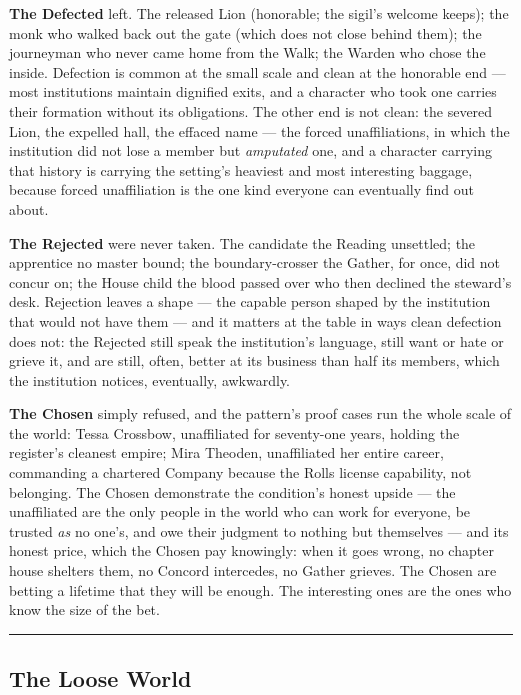 \textbf{The Defected} left. The released Lion (honorable; the sigil's welcome keeps); the monk who walked back out the gate (which does not close behind them); the journeyman who never came home from the Walk; the Warden who chose the inside. Defection is common at the small scale and clean at the honorable end --- most institutions maintain dignified exits, and a character who took one carries their formation without its obligations. The other end is not clean: the severed Lion, the expelled hall, the effaced name --- the forced unaffiliations, in which the institution did not lose a member but \textit{amputated} one, and a character carrying that history is carrying the setting's heaviest and most interesting baggage, because forced unaffiliation is the one kind everyone can eventually find out about.

\textbf{The Rejected} were never taken. The candidate the Reading unsettled; the apprentice no master bound; the boundary-crosser the Gather, for once, did not concur on; the House child the blood passed over who then declined the steward's desk. Rejection leaves a shape --- the capable person shaped by the institution that would not have them --- and it matters at the table in ways clean defection does not: the Rejected still speak the institution's language, still want or hate or grieve it, and are still, often, better at its business than half its members, which the institution notices, eventually, awkwardly.

\textbf{The Chosen} simply refused, and the pattern's proof cases run the whole scale of the world: Tessa Crossbow, unaffiliated for seventy-one years, holding the register's cleanest empire; Mira Theoden, unaffiliated her entire career, commanding a chartered Company because the Rolls license capability, not belonging. The Chosen demonstrate the condition's honest upside --- the unaffiliated are the only people in the world who can work for everyone, be trusted \textit{as} no one's, and owe their judgment to nothing but themselves --- and its honest price, which the Chosen pay knowingly: when it goes wrong, no chapter house shelters them, no Concord intercedes, no Gather grieves. The Chosen are betting a lifetime that they will be enough. The interesting ones are the ones who know the size of the bet.

\medskip\hrule\medskip

\subsection{The Loose World}

